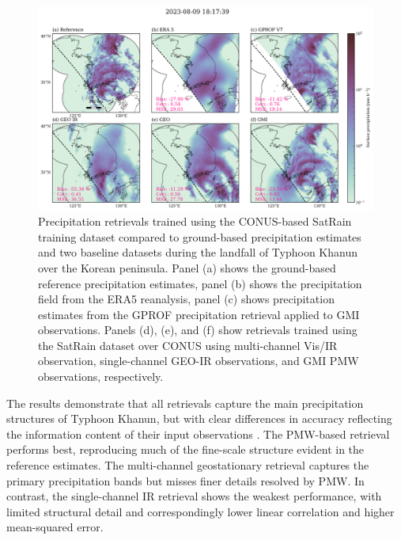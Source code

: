 \documentclass[11pt]{article}
\begin{document}
\begin{figure}[htbp] %
	\centering
	\includegraphics[width=1.0\textwidth]{figures/fig09}
	\caption{
		Precipitation retrievals trained using the CONUS-based SatRain
		training dataset compared to ground-based precipitation estimates and two
		baseline datasets during the landfall of Typhoon Khanun over the Korean
		peninsula. Panel (a) shows the ground-based reference precipitation
		estimates, panel (b) shows the precipitation field from the ERA5 reanalysis,
		panel (c) shows precipitation estimates from the GPROF precipitation
		retrieval applied to GMI observations. Panels (d), (e), and (f) show
		retrievals trained using the SatRain dataset over CONUS using multi-channel
		Vis/IR observation, single-channel GEO-IR observations, and GMI PMW
		observations, respectively.
	}
	\label{fig:case_study}
\end{figure}

The results demonstrate that all retrievals capture the main precipitation
structures of Typhoon Khanun, but with clear differences in accuracy reflecting
the information content of their input observations \citep{Kidd2011GPM}. The
PMW-based retrieval performs best, reproducing much of the fine-scale structure
evident in the reference estimates. The multi-channel geostationary retrieval
captures the primary precipitation bands but misses finer details resolved by
PMW. In contrast, the single-channel IR retrieval shows the weakest performance,
with limited structural detail and correspondingly lower linear correlation and
higher mean-squared error.
\end{document}
